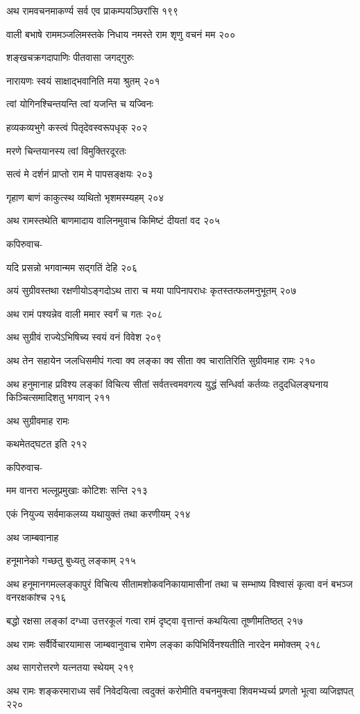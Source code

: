 अथ रामवचनमाकर्ण्य सर्व एव प्राकम्पयञ्छिरांसि १९९

वाली बभाषे राममञ्जलिमस्तके निधाय नमस्ते राम शृणु वचनं मम २००

शङ्खचक्रगदापाणिः पीतवासा जगद्गुरुः

नारायणः स्वयं साक्षाद्भवानिति मया श्रुतम् २०१

त्वां योगिनश्चिन्तयन्ति त्वां यजन्ति च यज्विनः

हव्यकव्यभुगे कस्त्वं पितृदेवस्वरूपधृक् २०२

मरणे चिन्तयानस्य त्वां विमुक्तिरदूरतः

सत्वं मे दर्शनं प्राप्तो राम मे पापसङ्क्षयः २०३

गृहाण बाणं काकुत्स्थ व्यथितो भृशमस्म्यहम् २०४

अथ रामस्तथेति बाणमादाय वालिनमुवाच किमिष्टं दीयतां वद २०५

कपिरुवाच-

यदि प्रसन्नो भगवान्मम सद्गतिं देहि २०६

अयं सुग्रीवस्तथा रक्षणीयोऽङ्गदोऽथ तारा च मया पापिनापराधः कृतस्तत्फलमनुभूतम् २०७

अथ रामं पश्यन्नेव वाली ममार स्वर्गं च गतः २०८

अथ सुग्रीवं राज्येऽभिषिच्य स्वयं वनं विवेश २०९

अथ तेन सहायेन जलधिसमीपं गत्वा क्व लङ्का क्व सीता क्व चारातिरिति सुग्रीवमाह रामः २१०

अथ हनुमानाह प्रविश्य लङ्कां विचित्य सीतां सर्वतत्त्वमवगत्य युद्धं सन्धिर्वा कर्तव्यः
तदुदधिलङ्घनाय किञ्चित्समादिशतु भगवान् २११

अथ सुग्रीवमाह रामः

कथमेतद्घटत इति २१२

कपिरुवाच-

मम वानरा भल्लूप्रमुखाः कोटिशः सन्ति २१३

एकं नियुज्य सर्वमाकलय्य यथायुक्तं तथा करणीयम् २१४

अथ जाम्बवानाह

हनूमानेको गच्छतु बुध्यतु लङ्काम् २१५

अथ हनूमानगमल्लङ्कापुरं विचित्य सीतामशोकवनिकायामासीनां तथा च सम्भाष्य विश्वासं कृत्वा वनं
बभञ्ज वनरक्षकांश्च २१६

बद्धो रक्षसा लङ्कां दग्ध्वा उत्तरकूलं गत्वा रामं दृष्ट्वा वृत्तान्तं कथयित्वा तूष्णीमतिष्ठत् २१७

अथ रामः सर्वैर्विचारयामास जाम्बवानुवाच रामेण लङ्का कपिभिर्विनश्यतीति नारदेन ममोक्तम्
 २१८

अथ सागरोत्तरणे यत्नतया स्थेयम् २१९

अथ रामः शङ्करमाराध्य सर्वं निवेदयित्वा त्वदुक्तं करोमीति वचनमुक्त्वा शिवमभ्यर्च्य प्रणतो
भूत्वा व्यजिज्ञपत् २२०

